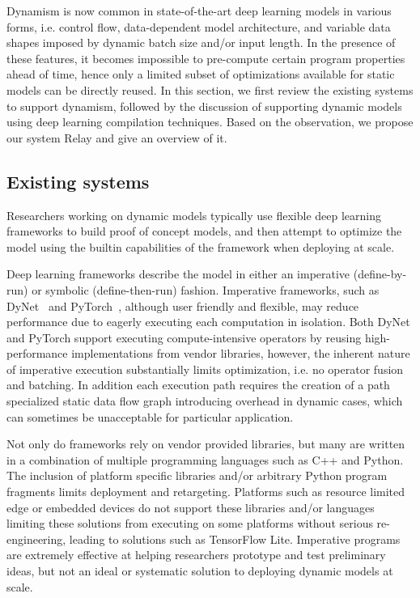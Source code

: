 
Dynamism is now common in state-of-the-art deep learning models in various forms, i.e. control flow, data-dependent model architecture, and variable data shapes imposed by dynamic batch size and/or input length.
In the presence of these features, it becomes impossible to pre-compute certain program properties ahead of time, hence only a limited subset of optimizations available for static models can be directly reused.
In this section, we first review the existing systems to support dynamism, followed by the discussion of supporting dynamic models using deep learning compilation techniques. Based on the observation, we propose our system Relay and give an overview of it.

\subsection{Existing systems}
\label{sec:background:existing}
Researchers working on dynamic models typically use flexible deep learning frameworks to build proof of concept models, and then attempt to optimize the model using the builtin capabilities of the framework when deploying at scale.

Deep learning frameworks describe the model in either an imperative (define-by-run) or symbolic (define-then-run) fashion.
Imperative frameworks, such as DyNet~\citep{dynet} and PyTorch~\citep{pytorch}, although user friendly and flexible, may reduce performance due to eagerly executing each computation in isolation.
Both DyNet and PyTorch support executing compute-intensive operators by reusing high-performance implementations from vendor libraries, however, the inherent nature of imperative execution substantially limits optimization, i.e. no operator fusion and batching.
In addition each execution path requires the creation of a path specialized static data flow graph introducing overhead in dynamic cases, which can sometimes be unacceptable for particular application.

Not only do frameworks rely on vendor provided libraries, but many are written in a combination of multiple programming languages such as C++ and Python. The inclusion of platform specific libraries and/or arbitrary Python program fragments limits deployment and retargeting.
Platforms such as resource limited edge or embedded devices do not support these libraries and/or languages limiting these solutions from executing on some platforms without serious re-engineering, leading to solutions such as TensorFlow Lite.
Imperative programs are extremely effective at helping researchers prototype and test preliminary ideas, but not an ideal or systematic solution to deploying dynamic models at scale.

